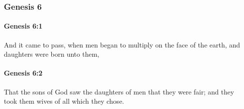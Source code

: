 	\subsubsection{Genesis 6} %
		\label{GENESIS-6}

		\paragraph{Genesis 6:1} %
			\label{GENESIS-6-1}

			And it came to pass, when men began to multiply on the face of the earth, and daughters were born unto them,


		\paragraph{Genesis 6:2} %
			\label{GENESIS-6-2}

			That the sons of God saw the daughters of men that they were fair; and they took them wives of all which they chose.

